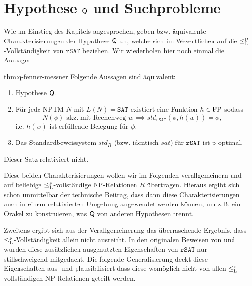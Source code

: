 \section{Hypothese $\mathsf{Q}$ und Suchprobleme}

Wie im Einstieg des Kapitels angesprochen, geben \textcite{fenner_inverting_2003} bzw. \textcite{messner_simulation_2001} äquivalente Charakterisierungen der Hypothese $\mathsf{Q}$ an, welche sich im Wesentlichen auf die $\leq_\mathrm{L}^\mathrm{p}$-Vollständigkeit von $\mathtt{rSAT}$ beziehen.
Wir wiederholen hier noch einmal die Aussage:
\begin{reptheorem}{thm:q-fenner-messner}
    Folgende Aussagen sind äquivalent:
    \begin{enumerate}
        \item Hypothese $\mathsf{Q}$.
        \item Für jede NPTM $N$ mit $L(N)=\mathtt{SAT}$ existiert eine Funktion $h\in \mathrm{FP}$ sodass 
        \[ N(\phi) \text{ akz. mit Rechenweg $w$} \implies \mathit{std}_{\mathtt{rSAT}}(\phi,h(w))=\phi, \]
        i.e. $h(w)$ ist erfüllende Belegung für $\phi$.
        \item Das Standardbeweissystem $\mathit{std}_R$ (bzw. identisch $\mathit{sat}$)
            für $\mathtt{rSAT}$ ist p-optimal.
    \end{enumerate}
    Dieser Satz relativiert nicht.
\end{reptheorem}

Diese beiden Charakterisierungen wollen wir im Folgenden verallgemeinern und auf beliebige $\leq_\mathrm{L}^\mathrm{p}$-vollständige NP-Relationen $R$ übertragen. 
Hieraus ergibt sich schon unmittelbar der technische Beitrag, dass dann diese Charakterisierungen auch in einem relativierten Umgebung angewendet werden können, um z.B. ein Orakel zu konstruieren, was $\mathsf{Q}$ von anderen Hypothesen trennt.

Zweitens ergibt sich aus der Verallgemeinerung das überraschende Ergebnis, dass $\leq_\mathrm{L}^\mathrm{p}$-Vollständigkeit allein nicht ausreicht. In den originalen Beweisen von \citeauthor{fenner_inverting_2003} und \citeauthor{messner_simulation_2001} wurden diese zusätzlichen ausgenutzten Eigenschaften von $\mathtt{rSAT}$ nur stillschweigend mitgedacht. Die folgende Generalisierung deckt diese Eigenschaften aus, und plausibilisiert dass diese womöglich nicht von allen $\leq_\mathrm{L}^\mathrm{p}$-vollständigen NP-Relationen geteilt werden.

